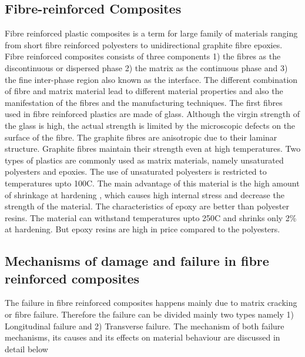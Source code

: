 \documentclass[a4paper,12pt]{extarticle}
\begin{document}
\subsection{Fibre-reinforced Composites}
\indent\indent\indent  Fibre reinforced plastic composites is a term for large family of materials ranging from short fibre reinforced polyesters to unidirectional graphite fibre epoxies. Fibre reinforced composites consists of three components 1) the fibres as the discontinuous or dispersed phase 2) the matrix as the continuous phase and 3) the fine inter-phase region also known as the interface. The different combination of fibre and matrix material lead to different material properties and also the manifestation of the fibres and the manufacturing techniques. The first fibres used in fibre reinforced plastics are made of glass. Although the virgin strength of the glass is high, the actual strength is limited by the microscopic defects on the surface of the fibre. The graphite fibres are anisotropic due to their laminar structure. Graphite fibres maintain their strength even at high temperatures. Two types of plastics are commonly used as matrix materials, namely unsaturated polyesters and epoxies. The use of unsaturated polyesters is restricted to temperatures upto 100C. The main advantage of this material is the high amount of shrinkage at hardening , which causes high internal stress and decrease the strength of the material.  The characteristics of epoxy are better than polyester resins. The material can withstand temperatures upto 250C and shrinks only  2\%  at hardening. But epoxy resins are high in price compared to the polyesters.

\subsection{Mechanisms of damage and failure in fibre reinforced composites}
\indent\indent\indent The failure in fibre reinforced composites happens mainly due to matrix cracking or fibre failure. Therefore the failure can be divided mainly two types namely 1) Longitudinal failure and 2) Transverse failure. The mechanism of both failure mechanisms, its causes and its effects on material behaviour are discussed in detail below
\end{document}
